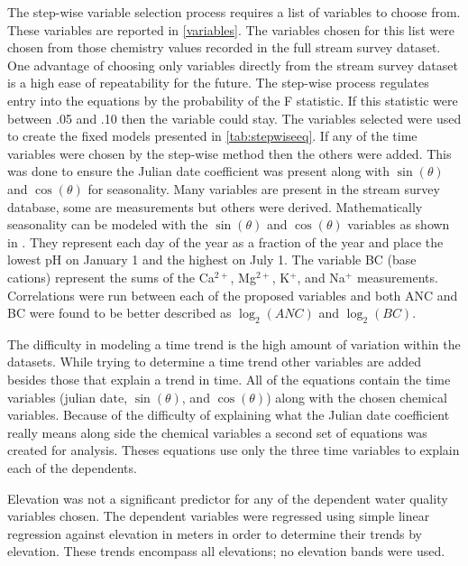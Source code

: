  The step-wise variable selection process requires a list of variables to choose from.  These variables are reported in \autoref{variables}.  The variables chosen for this list were chosen from those chemistry values recorded in the full stream survey dataset.   One advantage of choosing only variables directly from the stream survey dataset is a high ease of repeatability for the future.   The step-wise process regulates entry into the equations by the probability of the F statistic.  If this statistic were between .05 and .10 then the variable could stay.   The variables selected were used to create the fixed models presented in \autoref{tab:stepwiseeq}.  If any of the time variables were chosen by the step-wise method then the others were added.  This was done to ensure the Julian date coefficient was present along with $\sin(\theta)$ and $\cos(\theta)$ for seasonality.  Many variables are present in the stream survey database, some are measurements but others were derived.  Mathematically seasonality can be modeled with the $\sin(\theta)$ and $\cos(\theta)$ variables as shown in \citet{helsel1992statistical}.  They represent each day of the year as a fraction of the year and place the lowest pH on January 1 and the highest on July 1.  The variable BC (base cations) represent the sums of the Ca$^{2+}$, Mg$^{2+}$, K$^+$, and Na$^+$ measurements.  Correlations were run between each of the proposed variables  and both ANC and BC were found to be better described as $\log_2(ANC)$ and $\log_2(BC)$.
 
 The difficulty in modeling a time trend is the high amount of variation within the datasets.  While trying to determine a time trend other variables are added besides those that explain a trend in time. All of the equations contain the time variables (julian date, $\sin(\theta)$, and $\cos(\theta)$) along with the chosen chemical variables.  Because of the difficulty of explaining what the Julian date coefficient really means along side the chemical variables a second set of equations was created for analysis.  Theses equations use only the three time variables to explain each of the dependents.
 
 Elevation was not a significant predictor for any of the dependent water quality variables chosen.  The dependent variables were regressed using simple linear regression against elevation in meters in order to determine their trends by elevation.  These trends encompass all elevations; no elevation bands were used.
 
